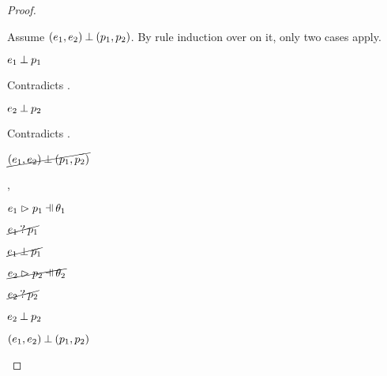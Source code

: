 \begin{proof}
\begin{byCases}
\begin{byCases}
\begin{byCases}
\begin{pfsteps*}
            \end{pfsteps*}
            Assume $(e_1 , e_2) \mathbin{\bot} (p_1 , p_2)$. By rule induction over  on it, only two cases apply.
            \begin{byCases}
            \item[\text{(\ref{rule:NMPairL})}]
                \begin{pfsteps*}
                \item $e_1 \mathbin{\bot} p_1$ 
                \end{pfsteps*}
                Contradicts .
            \item[\text{(\ref{rule:NMPairR})}]
                \begin{pfsteps*}
                \item $e_2 \mathbin{\bot} p_2$ 
                \end{pfsteps*}
                Contradicts .
            \end{byCases}
            \begin{pfsteps*}
            \item $\cancel{(e_1 , e_2) \mathbin{\bot} (p_1 , p_2)}$ 
            \end{pfsteps*}
        \item[\hpatmatch{e_1}{p_1}{\theta_1},\hnotmatch{e_2}{p_2}]
            \begin{pfsteps*}
            \item $\hpatmatch{e_1}{p_1}{\theta_1}$  
            \item $\cancel{e_1 \mathbin{?} p_1}$  
            \item $\cancel{e_1 \mathbin{\bot} p_1}$  
            \item $\cancel{\hpatmatch{e_2}{p_2}{\theta_2}}$  
            \item $\cancel{e_2 \mathbin{?} p_2}$  
            \item $e_2 \mathbin{\bot} p_2$  
            \item $(e_1 , e_2) \mathbin{\bot} (p_1 , p_2)$ 

\end{pfsteps*}
\end{byCases}
\end{byCases}
\end{byCases}
\end{proof}
